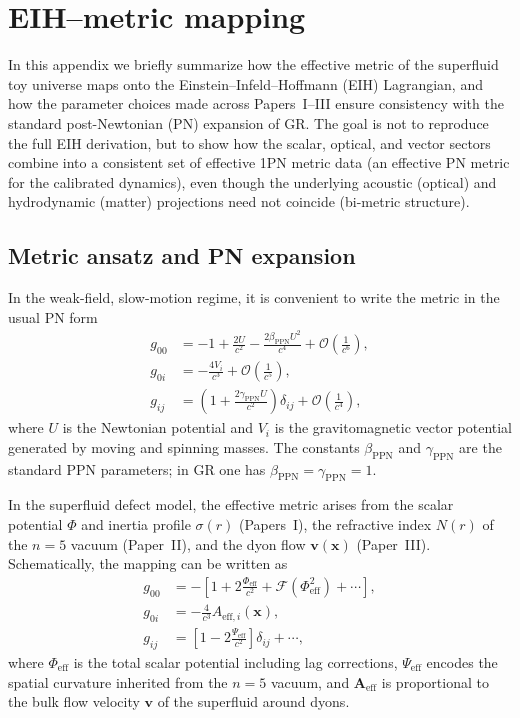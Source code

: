 \documentclass[11pt]{article}
\begin{document}
\section{EIH--metric mapping}
\label{app:eih-metric}

In this appendix we briefly summarize how the effective metric of the
superfluid toy universe maps onto the Einstein--Infeld--Hoffmann
(EIH) Lagrangian, and how the parameter choices made across
Papers~I--III ensure consistency with the standard post-Newtonian
(PN) expansion of GR.
The goal is not to reproduce the full EIH derivation, but to show how
the scalar, optical, and vector sectors combine into a consistent set of
effective 1PN metric data (an effective PN metric for the calibrated dynamics),
even though the underlying acoustic (optical) and hydrodynamic (matter)
projections need not coincide (bi-metric structure).

\subsection{Metric ansatz and PN expansion}

In the weak-field, slow-motion regime, it is convenient to write the
metric in the usual PN form
\begin{align}
g_{00}
  &= -1 + \frac{2U}{c^2} - \frac{2\beta_{\mathrm{PPN}} U^2}{c^4}
     + \mathcal{O}\!\left(\frac{1}{c^6}\right),
  \label{eq:app-g00-PN}\\
  g_{0i}
  &= -\frac{4V_i}{c^3}
     + \mathcal{O}\!\left(\frac{1}{c^5}\right),
  \label{eq:app-g0i-PN}\\
g_{ij}
  &= \left(1 + \frac{2\gamma_{\mathrm{PPN}} U}{c^2}\right)\delta_{ij}
     + \mathcal{O}\!\left(\frac{1}{c^4}\right),
  \label{eq:app-gij-PN}
\end{align}
where $U$ is the Newtonian potential and $V_i$ is the gravitomagnetic
vector potential generated by moving and spinning masses.
The constants $\beta_{\mathrm{PPN}}$ and $\gamma_{\mathrm{PPN}}$ are
the standard PPN parameters;
in GR one has $\beta_{\mathrm{PPN}}=\gamma_{\mathrm{PPN}}=1$.

In the superfluid defect model, the effective metric arises from the
scalar potential $\Phi$ and inertia profile $\sigma(r)$ (Papers~I),
the refractive index $N(r)$ of the $n=5$ vacuum (Paper~II), and the
dyon flow $\mathbf{v}(\mathbf{x})$ (Paper~III).
Schematically, the mapping can be written as
\begin{align}
  g_{00}
  &= -\left[ 1 + 2\frac{\Phi_{\text{eff}}}{c^2}
              + \mathcal{F}(\Phi_{\text{eff}}^2)
              + \cdots
      \right],
  \\
  g_{0i}
  &= -\frac{4}{c^3} A_{\text{eff},i}(\mathbf{x}),
  \\
  g_{ij}
  &= \left[1 - 2\frac{\Psi_{\text{eff}}}{c^2}\right]\delta_{ij}
     + \cdots,
\end{align}
where $\Phi_{\text{eff}}$ is the total scalar potential including
lag corrections, $\Psi_{\text{eff}}$ encodes the spatial curvature
inherited from the $n=5$ vacuum, and $\mathbf{A}_{\text{eff}}$ is
proportional to the bulk flow velocity $\mathbf{v}$ of the superfluid
around dyons.
\end{document}
